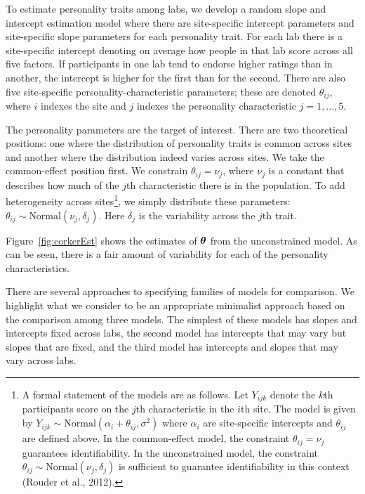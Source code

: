 \documentclass[english,man]{apa6}
\theoremstyle{definition}
\theoremstyle{definition}
\theoremstyle{remark}
\begin{document}
To estimate personality traits among labs, we develop a random slope and
intercept estimation model where there are site-specific intercept
parameters and site-specific slope parameters for each personality
trait. For each lab there is a site-specific intercept denoting on
average how people in that lab score across all five factors. If
participants in one lab tend to endorse higher ratings than in another,
the intercept is higher for the first than for the second. There are
also five site-specific personality-characteristic parameters; these are
denoted \(\theta_{ij}\), where \(i\) indexes the site and \(j\) indexes
the personality characteristic \(j=1,\ldots,5\).

The personality parameters are the target of interest. There are two
theoretical positions: one where the distribution of personality traits
is common across sites and another where the distribution indeed varies
across sites. We take the common-effect position first. We constrain
\(\theta_{ij}=\nu_j\), where \(\nu_j\) is a constant that describes how
much of the \(j\)th characteristic there is in the population. To add
heterogeneity across sites\footnote{A formal statement of the models are
  as follows. Let \(Y_{ijk}\) denote the \(k\)th participants score on
  the \(j\)th characteristic in the \(i\)th site. The model is given by
  \(Y_{ijk} \sim \mbox{Normal}(\alpha_i+\theta_{ij},\sigma^2)\) where
  \(\alpha_i\) are site-specific intercepts and \(\theta_{ij}\) are
  defined above. In the common-effect model, the constraint
  \(\theta_{ij}=\nu_j\) guarantees identifiability. In the unconstrained
  model, the constraint
  \(\theta_{ij} \sim \mbox{Normal}(\nu_j,\delta_j)\) is sufficient to
  guarantee identifiability in this context (Rouder et al., 2012).}, we
simply distribute these parameters:
\(\theta_{ij} \sim \mbox{Normal}(\nu_j,\delta_j)\). Here \(\delta_j\) is
the variability across the \(j\)th trait.

Figure~\ref{fig:corkerEst} shows the estimates of \(\bm \theta\) from the
unconstrained model. As can be seen, there is a fair amount of
variability for each of the personality characteristics.

There are several approaches to specifying families of models for
comparison. We highlight what we consider to be an appropriate
minimalist approach based on the comparison among three models. The
simplest of these models has slopes and intercepts fixed across labs,
the second model has intercepts that may vary but slopes that are fixed,
and the third model has intercepts and slopes that may vary across labs.
\end{document}
